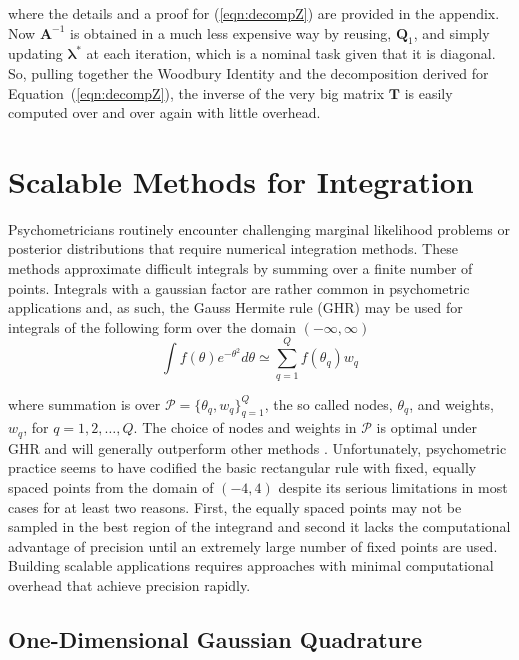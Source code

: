 \documentclass[12pt]{article}
\begin{document}
\noindent where the details and a proof for (\ref{eqn:decompZ}) are provided in the appendix. Now $\bm{A}^{-1}$ is obtained in a much less expensive way by reusing, $\bm{Q}_1$, and simply updating $\bm{\lambda}^*$ at each iteration, which is a nominal task given that it is diagonal. So, pulling together the Woodbury Identity and the decomposition derived for Equation~(\ref{eqn:decompZ}), the inverse of the very big matrix $\bm{T}$ is easily computed over and over again with little overhead. 

\section*{Scalable Methods for Integration}

Psychometricians routinely encounter challenging marginal likelihood problems or posterior distributions that require numerical integration methods. These methods approximate difficult integrals by summing over a finite number of points. Integrals with a gaussian factor are rather common in psychometric applications and, as such, the Gauss Hermite rule (GHR) may be used for integrals of the following form over the domain $(-\infty,\infty)$
\begin{equation}
\label{eqn:integral}
\int f(\theta)e^{-\theta^2} d\theta \simeq \sum_{q=1}^Q f(\theta_q)w_q
\end{equation}

\noindent where summation is over $\mathcal{P}=\{\theta_q,w_q\}^Q_{q=1}$, the so called nodes, $\theta_q$, and weights, $w_q$, for $q = 1,2, \ldots, Q$. The choice of nodes and weights in $\mathcal{P}$ is optimal under GHR and will generally outperform other methods \cite{Quarteroni}. Unfortunately, psychometric practice seems to have codified the basic rectangular rule with fixed, equally spaced points from the domain of $(-4,4)$ \cite{bock:eap} despite its serious limitations in most cases for at least two reasons. First, the equally spaced points may not be sampled in the best region of the integrand and second it lacks the computational advantage of precision until an extremely large number of fixed points are used. Building scalable applications requires approaches with minimal computational overhead that achieve precision rapidly. 

\subsection*{One-Dimensional Gaussian Quadrature}
\end{document}
